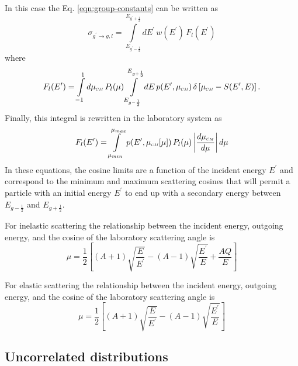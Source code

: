\documentclass[../main.tex]{subfiles}
\begin{document}
In this case the Eq. \eqref{eqn:group-constants} can be written as
\begin{equation}
  \sigma_{g^{\prime}\rightarrow g,l} = \int\limits_{E_{g^{\prime}-\frac{1}{2}}}^{E_{g^{\prime}+\frac{1}{2}}} dE^{\prime} \, w(E^{\prime}) \, F_l(E^{\prime})
\end{equation}
where
\begin{equation}
  F_l(E^{\prime}) = \int\limits_{-1}^{1} d\mucm \, P_l(\mu) \int\limits_{E_{g-\frac{1}{2}}}^{E_{g+\frac{1}{2}}} dE \, p(E^{\prime},\mucm) \, \delta\left[\mucm - S(E^{\prime},E)\right].
\end{equation}
Finally, this integral is rewritten in the laboratory system as
\begin{equation}
  F_l(E^{\prime}) = \int\limits_{\mu_{min}}^{\mu_{max}} p(E^{\prime},\mucm[\mu]) \, P_l(\mu) \left| \dfrac{d\mucm}{d\mu} \right|d\mu 
\end{equation}
In these equations, the cosine limits are a function of the incident energy $E^{\prime}$ and correspond to the minimum and maximum scattering cosines that will permit a particle with an initial energy $E^{\prime}$ to end up with a secondary energy between $E_{g-\frac{1}{2}}$ and $E_{g+\frac{1}{2}}$.

For inelastic scattering the relationship between the incident energy, outgoing energy, and the cosine of the laboratory scattering angle is
\begin{equation}
  \mu = \dfrac{1}{2} \left[ (A+1) \sqrt{\frac{E}{E^{\prime}}} - (A-1) \sqrt{\frac{E^{\prime}}{E}} + \dfrac{AQ}{E} \right]
\end{equation}

For elastic scattering the relationship between the incident energy, outgoing energy, and the cosine of the laboratory scattering angle is
\begin{equation}
  \mu = \dfrac{1}{2} \left[ (A+1) \sqrt{\frac{E}{E^{\prime}}} - (A-1) \sqrt{\frac{E^{\prime}}{E}} \right]
\end{equation}

\subsection{Uncorrelated distributions}
\end{document}

